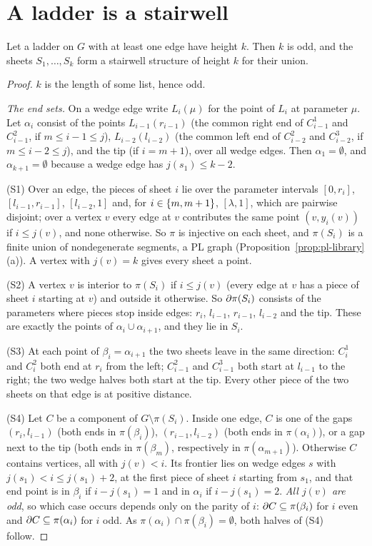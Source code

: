 \section{A ladder is a stairwell}

\begin{theorem}\label{thm:ladder-stairwell}
Let a ladder on $G$ with at least one edge have height $k$. Then $k$ is odd, and the sheets $S_1,\dots,S_k$ form a stairwell structure of height $k$ for their union.
\end{theorem}

\begin{proof}
$k$ is the length of some list, hence odd.

\emph{The end sets.} On a wedge edge write $L_i(\mu)$ for the point of $L_i$ at parameter $\mu$. Let $\alpha_i$ consist of the points $L_{i-1}(r_{i-1})$ (the common right end of $C^1_{i-1}$ and
$C^2_{i-1}$, if $m\le i-1\le j$), $L_{i-2}(l_{i-2})$ (the common left end of $C^2_{i-2}$ and $C^3_{i-2}$, if $m\le i-2\le j$), and the tip (if $i=m+1$), over all wedge edges. Then
$\alpha_1=\emptyset$, and $\alpha_{k+1}=\emptyset$ because a wedge edge has $j(s_1)\le k-2$.

(S1) Over an edge, the pieces of sheet $i$ lie over the parameter intervals $[0,r_i]$, $[l_{i-1},r_{i-1}]$, $[l_{i-2},1]$ and, for $i\in\left\{ m,m+1 \right\}$, $[\lambda,1]$, which are pairwise disjoint;
over a vertex $v$ every edge at $v$ contributes the same point $(v,y_i(v))$ if $i\le j(v)$, and none otherwise. So $\pi$ is injective on each sheet, and $\pi(S_i)$ is a finite union of
nondegenerate segments, a PL graph (Proposition~\ref{prop:pl-library}(a)). A vertex with $j(v)=k$ gives every sheet a point.

(S2) A vertex $v$ is interior to $\pi(S_i)$ if $i\le j(v)$ (every edge at $v$ has a piece of sheet $i$ starting at $v$) and outside it otherwise. So $\partial\pi(S_i)$ consists of the parameters
where pieces stop inside edges: $r_i$, $l_{i-1}$, $r_{i-1}$, $l_{i-2}$ and the tip. These are exactly the points of $\alpha_i\cup\alpha_{i+1}$, and they lie in $S_i$.

(S3) At each point of $\beta_i=\alpha_{i+1}$ the two sheets leave in the same direction: $C_i^1$ and $C_i^2$ both end at $r_i$ from the left; $C_{i-1}^2$ and $C_{i-1}^3$ both start at
$l_{i-1}$ to the right; the two wedge halves both start at the tip. Every other piece of the two sheets on that edge is at positive distance.

(S4) Let $C$ be a component of $G\setminus\pi(S_i)$. Inside one edge, $C$ is one of the gaps $(r_i,l_{i-1})$ (both ends in $\pi(\beta_i)$), $(r_{i-1},l_{i-2})$ (both ends in $\pi(\alpha_i)$), or a gap
next to the tip (both ends in $\pi(\beta_m)$, respectively in $\pi(\alpha_{m+1})$). Otherwise $C$ contains vertices, all with $j(v)<i$. Its frontier lies on wedge edges $s$ with $j(s_1)<i\le
j(s_1)+2$, at the first piece of sheet $i$ starting from $s_1$, and that end point is in $\beta_i$ if $i-j(s_1)=1$ and in $\alpha_i$ if $i-j(s_1)=2$. \emph{All $j(v)$ are odd}, so which case occurs
depends only on the parity of $i$: $\partial C\subseteq\pi(\beta_i)$ for $i$ even and $\partial C\subseteq\pi(\alpha_i)$ for $i$ odd. As $\pi(\alpha_i)\cap\pi(\beta_i)=\emptyset$, both halves of (S4) follow.


\end{proof}
